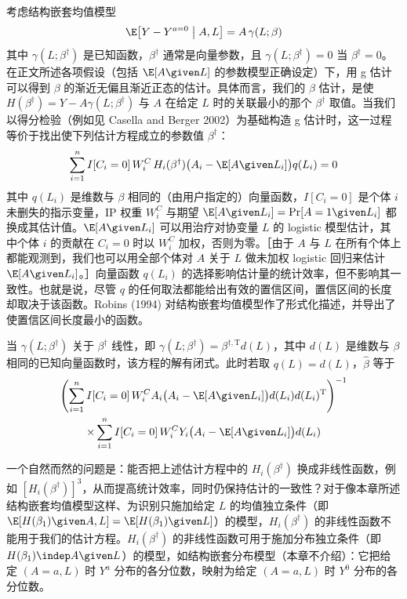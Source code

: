 \begin{techpoint}[结构嵌套均值模型的 g 估计]
考虑结构嵌套均值模型
\[
\E\bigl[Y-Y^{a=0}\bigm|A,L\bigr]=A\,\gamma(L;\beta)
\]
其中 $\gamma(L;\beta^\dagger)$ 是已知函数，$\beta^\dagger$ 通常是向量参数，且 $\gamma(L;\beta^\dagger)=0$ 当 $\beta^\dagger=0$。在正文所述各项假设（包括 $\E[A\given L]$ 的参数模型正确设定）下，用 g 估计可以得到 $\beta$ 的渐近无偏且渐近正态的估计。具体而言，我们的 $\beta$ 估计，是使 $H(\beta^\dagger)=Y-A\gamma(L;\beta^\dagger)$ 与 $A$ 在给定 $L$ 时的关联最小的那个 $\beta^\dagger$ 取值。当我们以得分检验（例如见 Casella and Berger 2002）为基础构造 g 估计时，这一过程等价于找出使下列估计方程成立的参数值 $\beta^\dagger$：
\[
\sum_{i=1}^{n}I[C_i=0]\,W_i^C\,H_i(\beta^\dagger)\bigl(A_i-\E[A\given L_i]\bigr)q(L_i)=0
\]
其中 $q(L_i)$ 是维数与 $\beta$ 相同的（由用户指定的）向量函数，$I[C_i=0]$ 是个体 $i$ 未删失的指示变量，IP 权重 $W_i^C$ 与期望 $\E[A\given L_i]=\Pr[A=1\given L_i]$ 都换成其估计值。$\E[A\given L_i]$ 可以用治疗对协变量 $L$ 的 logistic 模型估计，其中个体 $i$ 的贡献在 $C_i=0$ 时以 $W_i^C$ 加权，否则为零。［由于 $A$ 与 $L$ 在所有个体上都能观测到，我们也可以用全部个体对 $A$ 关于 $L$ 做未加权 logistic 回归来估计 $\E[A\given L_i]$。］向量函数 $q(L_i)$ 的选择影响估计量的统计效率，但不影响其一致性。也就是说，尽管 $q$ 的任何取法都能给出有效的置信区间，置信区间的长度却取决于该函数。Robins (1994) 对结构嵌套均值模型作了形式化描述，并导出了使置信区间长度最小的函数。

当 $\gamma(L;\beta^\dagger)$ 关于 $\beta^\dagger$ 线性，即 $\gamma(L;\beta^\dagger)=\beta^{\dagger,\mathrm T}d(L)$，其中 $d(L)$ 是维数与 $\beta$ 相同的已知向量函数时，该方程的解有闭式。此时若取 $q(L)=d(L)$，$\hat\beta$ 等于
\begin{multline*}
\Biggl(\sum_{i=1}^{n}I[C_i=0]\,W_i^C A_i\bigl(A_i-\E[A\given L_i]\bigr)d(L_i)d(L_i)^{\mathrm T}\Biggr)^{-1}\\
\times\sum_{i=1}^{n}I[C_i=0]\,W_i^C Y_i\bigl(A_i-\E[A\given L_i]\bigr)d(L_i)
\end{multline*}

一个自然而然的问题是：能否把上述估计方程中的 $H_i(\beta^\dagger)$ 换成非线性函数，例如 $[H_i(\beta^\dagger)]^3$，从而提高统计效率，同时仍保持估计的一致性？对于像本章所述结构嵌套均值模型这样、为识别只施加给定 $L$ 的均值独立条件（即 $\E[H(\beta_1)\given A,L]=\E[H(\beta_1)\given L]$）的模型，$H_i(\beta^\dagger)$ 的非线性函数不能用于我们的估计方程。$H_i(\beta^\dagger)$ 的非线性函数可用于施加分布独立条件（即 $H(\beta_1)\indep A\given L$）的模型，如结构嵌套分布模型（本章不介绍）：它把给定 $(A=a,L)$ 时 $Y^a$ 分布的各分位数，映射为给定 $(A=a,L)$ 时 $Y^0$ 分布的各分位数。


\end{techpoint}
